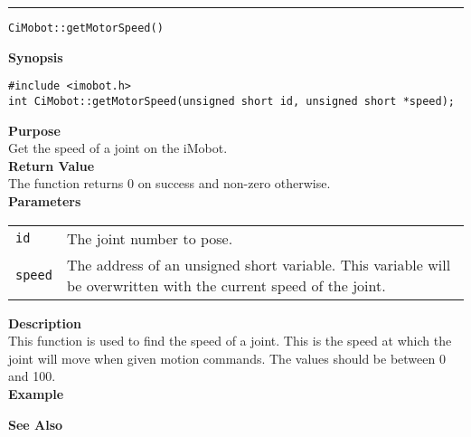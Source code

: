 \noindent
\vspace{5pt}
\rule{6.5in}{0.015in}
\noindent
{\LARGE \texttt{CiMobot::getMotorSpeed()}}\\
{}

\noindent
{\bf Synopsis}\\
\begin{verbatim}
#include <imobot.h>
int CiMobot::getMotorSpeed(unsigned short id, unsigned short *speed);
\end{verbatim}

\noindent
{\bf Purpose}\\
Get the speed of a joint on the iMobot.\\

\noindent
{\bf Return Value}\\
The function returns 0 on success and non-zero otherwise.\\

\noindent
{\bf Parameters}
\vspace{-0.1in}
\begin{description}
\item               
\begin{tabular}{p{10 mm}p{145 mm}}
\texttt{id} & The joint number to pose. \\
\texttt{speed} & The address of an unsigned short variable. This variable will be overwritten
with the current speed of the joint.
\end{tabular}
\end{description}

\noindent
{\bf Description}\\
This function is used to find the speed of a joint.  This is the speed at which the joint will move when given motion commands. The values should be between 0 and 100. \\

\noindent
{\bf Example}\\
\noindent

\noindent
{\bf See Also}\\

